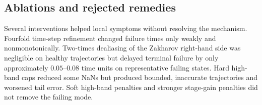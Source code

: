 \subsection{Ablations and rejected remedies}
\label{sec:rejected-remedies}

Several interventions helped local symptoms without resolving the mechanism.
Fourfold time-step refinement changed failure times only weakly and
nonmonotonically. Two-times dealiasing of the Zakharov right-hand side was
negligible on healthy trajectories but delayed terminal failure by only
approximately $0.05$--$0.08$ time units on representative failing states.
Hard high-band caps reduced some NaNs but produced bounded, inaccurate
trajectories and worsened tail error. Soft high-band penalties and stronger
stage-gain penalties did not remove the failing mode.

